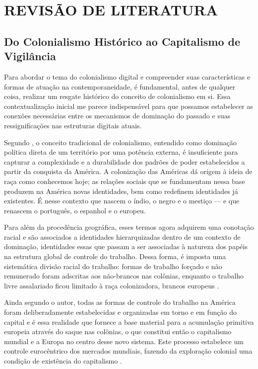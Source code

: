 
\chapter{REVISÃO DE LITERATURA}
\label{chap:revisaodeliteratura}

\section{Do Colonialismo Histórico ao Capitalismo de Vigilância}
\label{sec:colDigital}

Para abordar o tema do colonialismo digital e compreender suas características e formas de atuação na contemporaneidade, é fundamental, antes de qualquer coisa, realizar um resgate histórico do conceito de colonialismo em si. Essa contextualização inicial me parece indispensável para que possamos estabelecer as conexões necessárias entre os mecanismos de dominação do passado e suas ressignificações nas estruturas digitais atuais.

Segundo , o conceito tradicional de colonialismo, entendido como dominação política direta de um território por uma potência externa, é insuficiente para capturar a complexidade e a durabilidade dos padrões de poder estabelecidos a partir da conquista da América. A  colonização das Américas dá origem à ideia de raça como conhecemos hoje; as relações sociais que se fundamentam nessa base produzem na América novas identidades, bem como redefinem identidades já existentes. É nesse contexto que nascem o índio, o negro e o mestiço — e que renascem o  português, o espanhol e o europeu. 

Para além da procedência geográfica, esses termos agora adquirem uma conotação racial e são associados a identidades hierarquizadas dentro de um contexto de dominação, identidades essas que passam a ser associadas à natureza dos papéis na estrutura global de controle do trabalho. Dessa forma, é imposta uma sistemática divisão racial do trabalho: formas de trabalho forçado e não remunerado foram adscritas aos não-brancos nas colônias, enquanto o trabalho livre assalariado ficou limitado à raça colonizadora, brancos europeus \cite{quijano2005}. 

Ainda segundo o autor, todas as formas de controle do trabalho na América foram deliberadamente estabelecidas e organizadas em torno e em função do capital e é essa realidade que fornece a base material para a acumulação primitiva europeia através do saque nas colônias, o que constitui então o capitalismo mundial e a Europa no centro desse novo sistema. Este processo estabelece um controle eurocêntrico dos mercados mundiais, fazendo da exploração colonial uma condição de existência do capitalismo \cite{quijano2005}.

